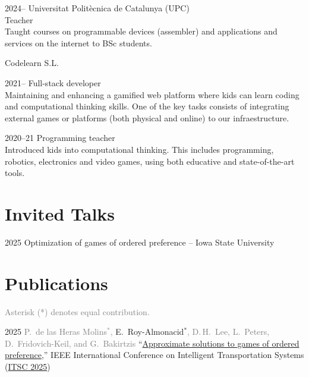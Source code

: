 \documentclass[a4paper]{report}
\begin{document}
    \begin{tablist}
      \item[2024--] \tab{}Universitat Politècnica de Catalunya (UPC)\\ Teacher\\\smallskip
        Taught courses on programmable devices (assembler) and applications and services on the internet to BSc students.
\vspace{0.5em}
      \item[] \tab{}Codelearn S.L.\vspace{-.25em}
        \item[2021--] \tab{}Full-stack developer\\\smallskip
        Maintaining and enhancing a gamified web platform where kids can learn coding and computational thinking skills. One of the key tasks consists of integrating external games or platforms (both physical and online) to our infraestructure.
       \item[2020--21] \tab{}Programming teacher\\\smallskip
       Introduced kids into computational thinking. This includes programming, robotics, electronics and video games, using both educative and state-of-the-art tools.
    \end{tablist}
\nocite{*}

\vspace{-1em}
\section*{Invited Talks}

\begin{tablist}
    \item[2025] \tab{}Optimization of games of ordered preference -- Iowa State University
\end{tablist}

\vspace{-1em}
\section*{Publications}
\textcolor{gray}{Asterisk (*) denotes equal contribution.}
\vspace{.5em}
\begin{tablist}
    \item[2025] \tab{}\textcolor{gray}{P.~de las Heras Molins$^*$,} E.~Roy-Almonacid$^*$\textcolor{gray}{, D.\,H.~Lee, L.~Peters, D.~Fridovich-Keil, and G.~Bakirtzis} ``\href{https://arxiv.org/abs/2507.11021}{Approximate solutions to games of ordered preference},'' IEEE International Conference on Intelligent Transportation Systems (\href{https://ieee-itsc.org/2025/}{ITSC 2025})
\end{tablist}
\end{document}
